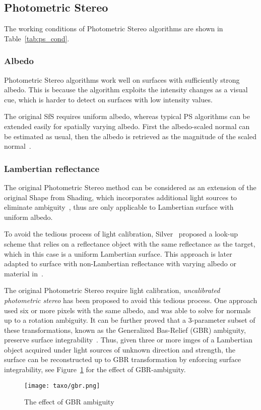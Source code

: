 \subsection{Photometric Stereo}
The working conditions of Photometric Stereo algorithms are shown in Table~\ref{tab:ps_cond}.

\subsubsection{Albedo}
Photometric Stereo algorithms work well on surfaces with sufficiently strong albedo. This is because the algorithm exploits the intensity changes as a visual cue, which is harder to detect on surfaces with low intensity values.

The original SfS requires uniform albedo, whereas typical PS algorithms can be extended easily for spatially varying albedo. First the albedo-scaled normal can be estimated as usual, then the albedo is retrieved as the magnitude of the scaled normal~\cite{woodham1980photometric}.

\subsubsection{Lambertian reflectance} %
The original Photometric Stereo method can be considered as an extension of the original Shape from Shading, which incorporates additional light sources to eliminate ambiguity~\cite{woodham1980photometric}, thus are only applicable to Lambertian surface with uniform albedo.

To avoid the tedious process of light calibration, Silver~\cite{silver1980determining} proposed a look-up scheme that relies on a reflectance object with the same reflectance as the target, which in this case is a uniform Lambertian surface. This approach is later adapted to surface with non-Lambertian reflectance with varying albedo or material in~\cite{hertzmann2005example}.

The original Photometric Stereo require light calibration, \textit{uncalibrated photometric stereo} has been proposed to avoid this tedious process. One approach used six or more pixels with the same albedo, and was able to solve for normals up to a rotation ambiguity\cite{hayakawa1994photometric}. It can be further proved that a 3-parameter subset of these transformations, known as the Generalized Bas-Relief (GBR) ambiguity, preserve surface integrability~\cite{belhumeur1999bas}. Thus, given three or more imges of a Lambertian object acquired under light sources of unknown direction and strength, the surface can be reconstructed up to GBR transformation by enforcing surface integrability, see Figure~\ref{fig:gbr} for the effect of GBR-ambiguity.
\begin{figure}[!htbp]
\centering
\texttt{[image: taxo/gbr.png]}
\caption{The effect of GBR ambiguity}
\label{fig:gbr}
\end{figure}

